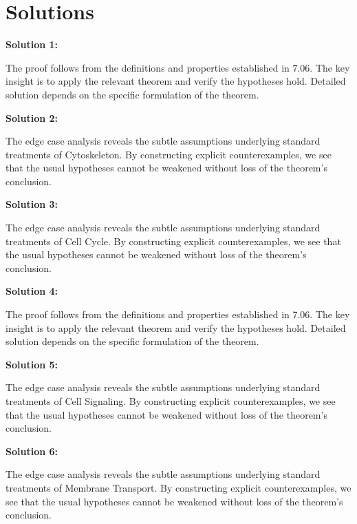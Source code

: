\documentclass[12pt,a4paper]{exam}
\begin{document}
\newpage
\section*{Solutions}

\textbf{Solution 1:}

The proof follows from the definitions and properties established in 7.06. The key insight is to apply the relevant theorem and verify the hypotheses hold. Detailed solution depends on the specific formulation of the theorem.

\vspace{0.5cm}

\textbf{Solution 2:}

The edge case analysis reveals the subtle assumptions underlying standard treatments of Cytoskeleton. By constructing explicit counterexamples, we see that the usual hypotheses cannot be weakened without loss of the theorem's conclusion.

\vspace{0.5cm}

\textbf{Solution 3:}

The edge case analysis reveals the subtle assumptions underlying standard treatments of Cell Cycle. By constructing explicit counterexamples, we see that the usual hypotheses cannot be weakened without loss of the theorem's conclusion.

\vspace{0.5cm}

\textbf{Solution 4:}

The proof follows from the definitions and properties established in 7.06. The key insight is to apply the relevant theorem and verify the hypotheses hold. Detailed solution depends on the specific formulation of the theorem.

\vspace{0.5cm}

\textbf{Solution 5:}

The edge case analysis reveals the subtle assumptions underlying standard treatments of Cell Signaling. By constructing explicit counterexamples, we see that the usual hypotheses cannot be weakened without loss of the theorem's conclusion.

\vspace{0.5cm}

\textbf{Solution 6:}

The edge case analysis reveals the subtle assumptions underlying standard treatments of Membrane Transport. By constructing explicit counterexamples, we see that the usual hypotheses cannot be weakened without loss of the theorem's conclusion.
\end{document}
